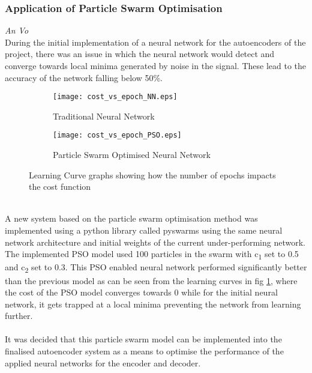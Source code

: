     \subsubsection{Application of Particle Swarm Optimisation} \hspace*{0pt}\hfill \textit{An Vo}\\
    \label{sec:application_particle_swarm_optimization}
        During the initial implementation of a neural network for the autoencoders of the project, there was an issue in which the neural network would detect and converge towards local minima generated by noise in the signal. These lead to the accuracy of the network falling below 50\%. 
        \begin{figure}[H]
        \begin{subfigure}[h]{0.53\linewidth}
        \texttt{[image: cost\_vs\_epoch\_NN.eps]}
        \caption{Traditional Neural Network}
        \end{subfigure}
        \hfill
        \begin{subfigure}[h]{0.53\linewidth}
        \texttt{[image: cost\_vs\_epoch\_PSO.eps]}
        \caption{Particle Swarm Optimised Neural Network}
        \end{subfigure}%
        \caption{Learning Curve graphs showing how the number of epochs impacts the cost function}
        \label{fig:cost_functions}
        \end{figure}
        \\
        
        A new system based on the particle swarm optimisation method was implemented using a python library called pyswarms \autocite{pyswarms} using the same neural network architecture and initial weights of the current under-performing network. The implemented PSO model used 100 particles in the swarm with c\textsubscript1 set to 0.5 and c\textsubscript2 set to 0.3. This PSO enabled neural network performed significantly better than the previous model as can be seen from the learning curves in fig \ref{fig:cost_functions}, where the cost of the PSO model converges towards 0 while for the initial neural network, it gets trapped at a local minima preventing the network from learning further.
        \\
        \\
        It was decided that this particle swarm model can be implemented into the finalised autoencoder system as a means to optimise the performance of the applied neural networks for the encoder and decoder.
